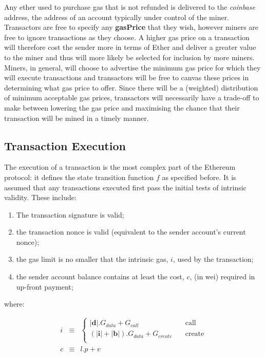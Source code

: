 \documentclass[9pt,oneside]{amsart}
\begin{document}
\begin{multicols}{2}
Any ether used to purchase gas that is not refunded is delivered to the \textit{coinbase} address, the address of an account typically under control of the miner. Transactors are free to specify any \textbf{gasPrice} that they wish, however miners are free to ignore transactions as they choose. A higher gas price on a transaction will therefore cost the sender more in terms of Ether and deliver a greater value to the miner and thus will more likely be selected for inclusion by more miners. Miners, in general, will choose to advertise the minimum gas price for which they will execute transactions and transactors will be free to canvas these prices in determining what gas price to offer. Since there will be a (weighted) distribution of minimum acceptable gas prices, transactors will necessarily have a trade-off to make between lowering the gas price and maximising the chance that their transaction will be mined in a timely manner.


\subsection{Transaction Execution} \label{ch:execution}

The execution of a transaction is the most complex part of the Ethereum protocol: it defines the state transition function $f$ as specified before. It is assumed that any transactions executed first pass the initial tests of intrinsic validity. These include:

\begin{enumerate}
\item The transaction signature is valid;
\item the transaction nonce is valid (equivalent to the sender account's current nonce);
\item the gas limit is no smaller that the intrinsic gas, $i$, used by the transaction;
\item the sender account balance contains at least the cost, $c$, (in wei) required in up-front payment;
\end{enumerate}

where:

\begin{eqnarray}
i & \equiv & \begin{cases}
  |\mathbf{d}|.G_{data} + G_{call} & \quad \text{call} \\
  (|\mathbf{i}| + |\mathbf{b}|).G_{data} + G_{create} & \quad \text{create} \\
\end{cases} \\
c & \equiv & l.p + v
\end{eqnarray}


\end{multicols}
\end{document}
